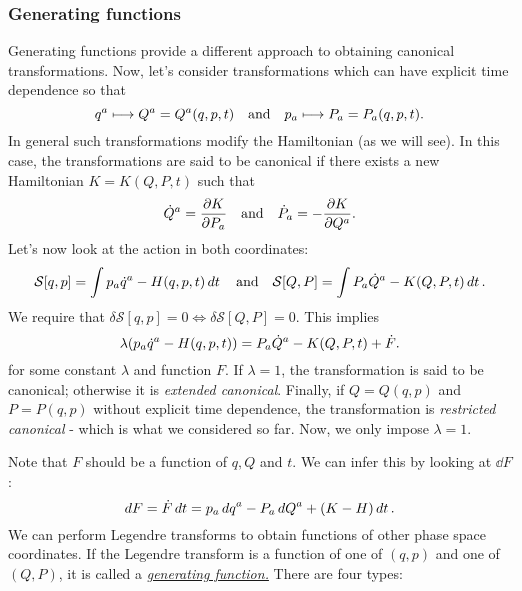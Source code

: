 \documentclass{article}
\begin{document}
\subsubsection{Generating functions}
Generating functions provide a different approach to obtaining canonical transformations. Now, let's consider transformations which can have explicit time dependence so that
\begin{equation}
	q^{a} \longmapsto Q^{a} = Q^{a}(q,p,t) \qq{and} p_{a} \longmapsto P_{a} = P_{a}(q,p,t).
\end{equation}
In general such transformations modify the Hamiltonian (as we will see). In this case, the transformations are said to be canonical if there exists a new Hamiltonian $K = K(Q,P,t)$ such that
\begin{equation}
	\dot{Q}^{a} = \pdv{K}{P_{a}} \qq{and} \dot{P}_{a} = -\pdv{K}{Q^{a}}.
\end{equation}
Let's now look at the action in both coordinates:
\begin{equation}
	\mathcal{S}[q,p] = \int p_{a} \dot{q}^{a} - H(q,p,t) \dd{t} \qq{and} \mathcal{S}[Q,P] = \int P_{a} \dot{Q}^{a} - K(Q,P,t) \dd{t}.
\end{equation}
We require that $ \delta \mathcal{S}[q,p] = 0 \Leftrightarrow \delta \mathcal{S}[Q,P] = 0 $. This implies
\begin{equation}
	\lambda \qty(p_{a} \dot{q}^{a} - H(q,p,t)) = P_{a} \dot{Q}^{a} - K(Q,P,t) + \dot{F}.
\end{equation}
for some constant $ \lambda $ and function $ F $. If $ \lambda = 1 $, the transformation is said to be canonical; otherwise it is \textit{extended canonical}. Finally, if $ Q=Q(q,p) $ and $ P=P(q,p) $ without explicit time dependence, the transformation is \textit{restricted canonical} - which is what we considered so far. Now, we only impose $ \lambda = 1 $.
\par
Note that $ F $ should be a function of $ q, Q $ and $ t $. We can infer this by looking at $ \dd{F} $:
\begin{equation}
	\dd{F} = \dot{F} \dd{t} = p_{a} \dd{q}^{a} - P_{a} \dd{Q}^{a} + \qty(K - H) \dd{t}.
\end{equation}
We can perform Legendre transforms to obtain functions of other phase space coordinates. If the Legendre transform is a function of one of $ (q,p) $ and one of $ (Q,P) $, it is called a \href{https://en.wikipedia.org/wiki/Canonical_transformation#Generating_function_approach}{\textit{generating function.}} There are four types:
\end{document}
